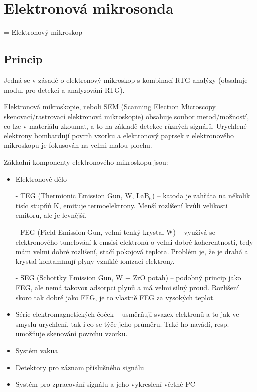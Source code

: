 \section[Elektronová mikrosonda]{Elektronová mikrosonda}

= Elektronový mikroskop

\subsection{Princip}

Jedná se v zásadě o elektronový mikroskop s kombinací RTG analýzy (obsahuje modul pro detekci a analyzování RTG).

Elektronová mikroskopie, neboli SEM (Scanning Electron Microscopy = skenovací/rastrovací elektronová mikroskopie) obsahuje soubor metod/možností, co lze v materiálu zkoumat, a to na základě detekce různých signálů. Urychlené elektrony bombardují povrch vzorku a elektronový paprsek z elektronového mikroskopu je fokusován na velmi malou plochu.

Základní komponenty elektronového mikroskopu jsou: \begin{itemize}
    \item Elektronové dělo 
    \item[-] TEG (Thermionic Emission Gun, W, LaB$_6$) -- katoda je zahřáta na několik tisíc stupňů K, emituje termoelektrony. Menší rozlišení kvůli velikosti emitoru, ale je levnější.
    \item[-] FEG (Field Emission Gun, velmi tenký krystal W) -- využívá se elektronového tunelování k emsisi elektronů o velmi dobré koherentnosti, tedy mám velmi dobré rozlišení, stačí pokojová teplota. Problém je, že je drahá a krystal kontaminují plyny vzniklé ionizací elektrony.
    \item[-] SEG (Schottky Emission Gun, W + ZrO potah) -- podobný princip jako FEG, ale nemá takovou adsorpci plynů a má velmi silný proud. Rozlišení skoro tak dobré jako FEG, je to vlastně FEG za vysokých teplot.
    \item Série elektromagnetických čoček -- usměrňuji svazek elektronů a to jak ve smyslu urychlení, tak i co se týče jeho průměru. Také ho navádí, resp. umožňuje skenování povrchu vzorku.
    \item Systém vakua
    \item Detektory pro záznam příslušného signálu
    \item Systém pro zpracování signálu a jeho vykreslení včetně PC
\end{itemize} 


